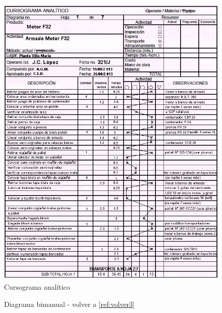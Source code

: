 \documentclass[a4paper,oneside,11pt]{article}
\begin{document}
\begin{figure} [ht!]
    \centering
    \includegraphics[scale=1.1]{proforma.png}
    \caption{Cursograma analítico}
    \label{fig:proforma}
\end{figure}

\begin{figure} [ht!]
    \centering
    \caption{Diagrama bimanual - volver a \ref{ref:volver3}}
    \label{fig:bimanual}
\end{figure}
\end{document}
